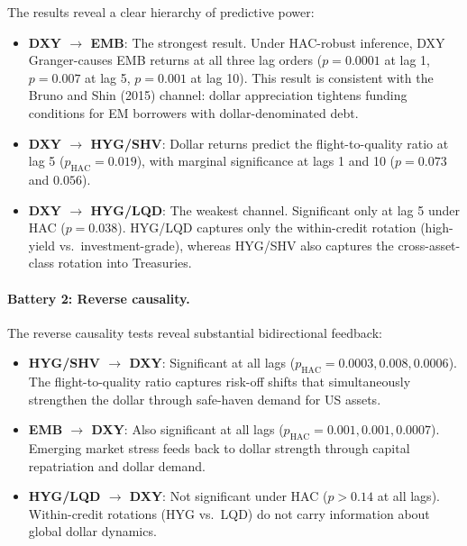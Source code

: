 \documentclass[12pt,a4paper]{article}
\begin{document}
The results reveal a clear hierarchy of predictive power:

\begin{itemize}
  \item \textbf{DXY $\rightarrow$ EMB}: The strongest result. Under HAC-robust inference, DXY Granger-causes EMB returns at all three lag orders ($p = 0.0001$ at lag 1, $p = 0.007$ at lag 5, $p = 0.001$ at lag 10). This result is consistent with the Bruno and Shin (2015) channel: dollar appreciation tightens funding conditions for EM borrowers with dollar-denominated debt.

  \item \textbf{DXY $\rightarrow$ HYG/SHV}: Dollar returns predict the flight-to-quality ratio at lag 5 ($p_{\text{HAC}} = 0.019$), with marginal significance at lags 1 and 10 ($p = 0.073$ and $0.056$).

  \item \textbf{DXY $\rightarrow$ HYG/LQD}: The weakest channel. Significant only at lag 5 under HAC ($p = 0.038$). HYG/LQD captures only the within-credit rotation (high-yield vs.\ investment-grade), whereas HYG/SHV also captures the cross-asset-class rotation into Treasuries.
\end{itemize}

\paragraph{Battery 2: Reverse causality.}



The reverse causality tests reveal substantial bidirectional feedback:

\begin{itemize}
  \item \textbf{HYG/SHV $\rightarrow$ DXY}: Significant at all lags ($p_{\text{HAC}} = 0.0003, 0.008, 0.0006$). The flight-to-quality ratio captures risk-off shifts that simultaneously strengthen the dollar through safe-haven demand for US assets.

  \item \textbf{EMB $\rightarrow$ DXY}: Also significant at all lags ($p_{\text{HAC}} = 0.001, 0.001, 0.0007$). Emerging market stress feeds back to dollar strength through capital repatriation and dollar demand.

  \item \textbf{HYG/LQD $\rightarrow$ DXY}: Not significant under HAC ($p > 0.14$ at all lags). Within-credit rotations (HYG vs.\ LQD) do not carry information about global dollar dynamics.
\end{itemize}
\end{document}
